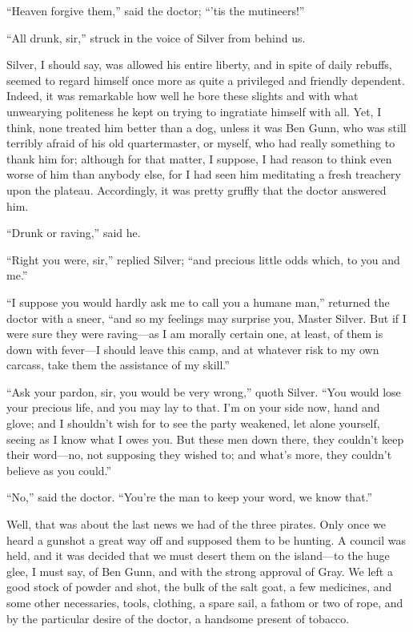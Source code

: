\enquote{Heaven forgive them,} said the doctor; \enquote{’tis the mutineers!}

\enquote{All drunk, sir,} struck in the voice of Silver from behind us.

Silver, I should say, was allowed his entire liberty, and in spite of daily rebuffs, seemed to regard himself once more as quite a privileged and friendly dependent. Indeed, it was remarkable how well he bore these slights and with what unwearying politeness he kept on trying to ingratiate himself with all. Yet, I think, none treated him better than a dog, unless it was Ben Gunn, who was still terribly afraid of his old quartermaster, or myself, who had really something to thank him for; although for that matter, I suppose, I had reason to think even worse of him than anybody else, for I had seen him meditating a fresh treachery upon the plateau. Accordingly, it was pretty gruffly that the doctor answered him.

\enquote{Drunk or raving,} said he.

\enquote{Right you were, sir,} replied Silver; \enquote{and precious little odds which, to you and me.}

\enquote{I suppose you would hardly ask me to call you a humane man,} returned the doctor with a sneer, \enquote{and so my feelings may surprise you, Master Silver. But if I were sure they were raving---as I am morally certain one, at least, of them is down with fever---I should leave this camp, and at whatever risk to my own carcass, take them the assistance of my skill.}

\enquote{Ask your pardon, sir, you would be very wrong,} quoth Silver. \enquote{You would lose your precious life, and you may lay to that. I’m on your side now, hand and glove; and I shouldn’t wish for to see the party weakened, let alone yourself, seeing as I know what I owes you. But these men down there, they couldn’t keep their word---no, not supposing they wished to; and what’s more, they couldn’t believe as you could.}

\enquote{No,} said the doctor. \enquote{You’re the man to keep your word, we know that.}

Well, that was about the last news we had of the three pirates. Only once we heard a gunshot a great way off and supposed them to be hunting. A council was held, and it was decided that we must desert them on the island---to the huge glee, I must say, of Ben Gunn, and with the strong approval of Gray. We left a good stock of powder and shot, the bulk of the salt goat, a few medicines, and some other necessaries, tools, clothing, a spare sail, a fathom or two of rope, and by the particular desire of the doctor, a handsome present of tobacco.

